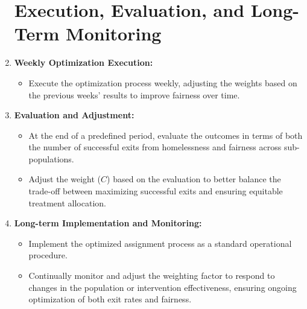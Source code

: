\documentclass{article}
\begin{document}
\begin{enumerate}
  \section*{Execution, Evaluation, and Long-Term Monitoring}

  \item \textbf{Weekly Optimization Execution:}
  \begin{itemize}
    \item Execute the optimization process weekly, adjusting the weights based on the previous weeks' results to improve fairness over time.
  \end{itemize}

  \item \textbf{Evaluation and Adjustment:}
  \begin{itemize}
    \item At the end of a predefined period, evaluate the outcomes in terms of both the number of successful exits from homelessness and fairness across sub-populations.
    \item Adjust the weight ($C$) based on the evaluation to better balance the trade-off between maximizing successful exits and ensuring equitable treatment allocation.
  \end{itemize}

  \item \textbf{Long-term Implementation and Monitoring:}
  \begin{itemize}
    \item Implement the optimized assignment process as a standard operational procedure.
    \item Continually monitor and adjust the weighting factor to respond to changes in the population or intervention effectiveness, ensuring ongoing optimization of both exit rates and fairness.
  \end{itemize}
\end{enumerate}
\end{document}
